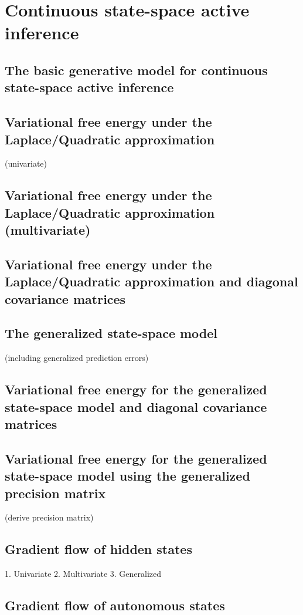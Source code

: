 \chapter{Continuous state-space active inference}

\section{The basic generative model for continuous state-space active inference}
\section{Variational free energy under the Laplace/Quadratic approximation}(univariate)
\section{Variational free energy under the Laplace/Quadratic approximation (multivariate)}
\section{Variational free energy under the Laplace/Quadratic approximation and diagonal covariance matrices}
\section{The generalized state-space model}

(including generalized prediction errors)

\section{Variational free energy for the generalized state-space model and diagonal covariance matrices}
\section{Variational free energy for the generalized state-space model using the generalized precision matrix} 

(derive precision matrix)

\section{Gradient flow of hidden states}

   1. Univariate
   2. Multivariate
   3. Generalized

\section{Gradient flow of autonomous states}

